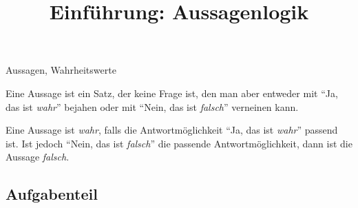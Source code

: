 \documentclass{uebungsblatt}
\title{Einführung: Aussagenlogik}
\begin{document}
\maketitle
\begin{contents}
    Aussagen, Wahrheitswerte
\end{contents}


\begin{definition}
    Eine Aussage ist ein Satz, der keine Frage ist, den man aber entweder mit 
    \enquote{Ja, das ist \emph{wahr}} bejahen oder mit \enquote{Nein, das ist \emph{falsch}} 
    verneinen kann.
\end{definition}

\begin{definition}
    Eine Aussage ist \emph{wahr}, falls die Antwortmöglichkeit \enquote{Ja, das ist \emph{wahr}}
    passend ist. Ist jedoch \enquote{Nein, das ist \emph{falsch}} die passende
    Antwortmöglichkeit, dann ist die Aussage \emph{falsch}.
\end{definition}

\subsection*{Aufgabenteil}

\end{document}
